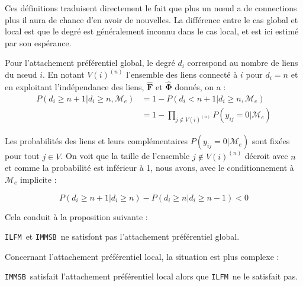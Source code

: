 \documentclass[french]{hermes-journal}
\newcommand{\ilfm}{\texttt{ILFM}}
\newcommand{\immsb}{\texttt{IMMSB}}
\begin{document}
Ces définitions traduisent directement le fait que plus un n\oe{}ud a de connections plus il aura de chance d'en avoir de nouvelles. La différence entre le cas global et local est que le degré est généralement inconnu dans le cas local, et est ici estimé par son espérance.



Pour l'attachement préférentiel global, le degré $d_i$ correspond au nombre de liens du n\oe{}ud $i$. En notant $V(i)^{(n)}$ l'ensemble des liens connecté à $i$ pour $d_i = n$ et en exploitant l'indépendance des liens, $\bm{\hat{F}}$ et $\bm{\hat{\Phi}}$ donnés, on a :
%
\begin{align*}
    P(d_i \geq n+1 | d_i \geq n,  \mathcal{M}_e) &= 1 - P(d_i < n+1 | d_i \geq n, \mathcal{M}_e) \\
                                 &= 1 - \prod_{j\notin V(i)^{(n)}} P(y_{ij}=0 | \mathcal{M}_e)
\end{align*}

Les probabilités des liens et leurs complémentaires $P(y_{ij}=0 | \mathcal{M}_e)$ sont fixées pour tout $j\in V$. On voit que la taille de  l'ensemble $j\notin V(i)^{(n)}$ décroit avec $n$ et comme la probabilité est inférieur à 1, nous avons, avec le conditionnement à $\mathcal{M}_e$ implicite :

\begin{equation*}
    P(d_i \geq n+1 | d_i \geq n) -  P(d_i \geq n | d_i \geq n-1) < 0
\end{equation*}

Cela conduit à la proposition suivante :



\begin{proposition}[]
\label{pref-attch-glob}
\ilfm\ et \immsb\ ne satisfont pas l'attachement préférentiel global.
\end{proposition}

Concernant l'attachement préférentiel local, la situation est plus complexe :

\begin{proposition}[]
\label{pref-attch-loc}
\immsb\ satisfait l'attachement préférentiel local alors que \ilfm\ ne le satisfait pas.
\end{proposition}
\end{document}
